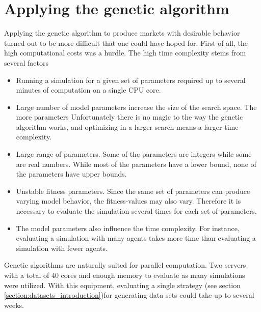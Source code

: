 \section{Applying the genetic algorithm}
Applying the genetic algorithm to produce markets with desirable behavior turned out to be more difficult that one could have hoped for. First of all, the high computational costs was a hurdle. The high time complexity stems from several factors
\begin{itemize}
\item Running a simulation for a given set of parameters required up to several minutes of computation on a single CPU core.
\item Large number of model parameters increase the size of the search space. The more parameters Unfortunately there is no magic to the way the genetic algorithm works, and optimizing in a larger search means a larger time complexity.
\item Large range of parameters. Some of the parameters are integers while some are real numbers. While most of the parameters have a lower bound, none of the parameters have upper bounds.
\item Unstable fitness parameters. Since the same set of parameters can produce varying model behavior, the fitness-values may also vary. Therefore it is necessary to evaluate the simulation several times for each set of parameters. 
\item The model parameters also influence the time complexity. For instance, evaluating a simulation with many agents takes more time than evaluating a simulation with fewer agents. 
\end{itemize}
Genetic algorithms are naturally suited for parallel computation. Two servers with a total of 40 cores and enough memory to evaluate as many simulations were utilized. With this equipment, evaluating a single strategy (see section \ref{section:datasets_introduction})for generating data sets could take up to several weeks.


